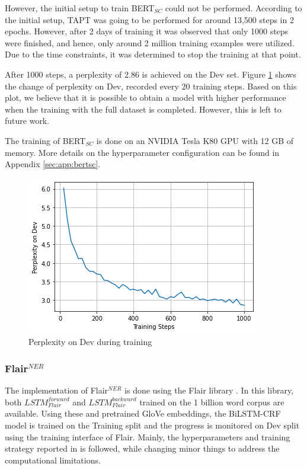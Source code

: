 \documentclass{report}
\theoremstyle{definition}
\theoremstyle{remark}
\begin{document}
However, the initial setup to train BERT$_{SC}$ could not be performed. According to the initial setup, TAPT was going to be performed for around 13,500 steps in 2 epochs. However, after 2 days of training it was observed that only 1000 steps were finished, and hence, only around 2 million training examples were utilized. Due to the time constraints, it was determined to stop the training at that point. 

After 1000 steps, a perplexity of 2.86 is achieved on the Dev set. Figure \ref{fig:perp} shows the change of perplexity on Dev, recorded every 20 training steps. Based on this plot, we believe that it is possible to obtain a model with higher performance when the training with the full dataset is completed. However, this is left to future work.

The training of BERT$_{SC}$ is done on an NVIDIA Tesla K80 GPU with 12 GB of memory. More details on the hyperparameter configuration can be found in Appendix \ref{sec:app:bertsc}.

\begin{figure}
    \centering
    \includegraphics[scale=0.7]{perpplot.png}
    \caption{Perplexity on Dev during training}
    \label{fig:perp}
\end{figure}

\subsubsection{Flair$^{NER}$}
The implementation of Flair$^{NER}$ is done using the Flair library \cite{flairlib}. In this library, both $LSTM^{forward}_{Flair}$ and $LSTM^{backward}_{Flair}$ trained on the 1 billion word corpus \cite{onebillion} are available. Using these and pretrained GloVe embeddings, the BiLSTM-CRF model is trained on the Training split and the progress is monitored on Dev split using the training interface of Flair.  Mainly, the hyperparameters and training strategy reported in \cite{flairpaper} is followed, while changing minor things to address the computational limitations. 
\end{document}
